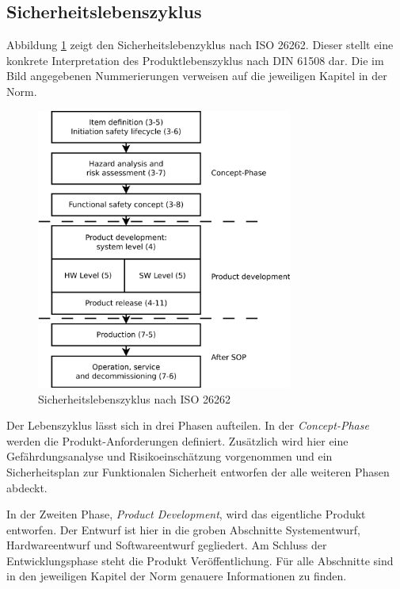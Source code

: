 \documentclass[
  a4paper,					    %
  twoside,
  DIV=calc,     				%
  bibliography=totoc,
  cleardoublepage=empty,
  ngerman,     					%
  final       					%
]{scrbook}
\begin{document}
\subsection{Sicherheitslebenszyklus}
\label{sec:ISO26262_lebenszyklus}

Abbildung \ref{fig:lifecycle} zeigt den Sicherheitslebenzyklus nach ISO 26262. Dieser stellt eine konkrete Interpretation des Produktlebenszyklus nach DIN 61508 dar. Die im Bild angegebenen Nummerierungen verweisen auf die jeweiligen Kapitel in der Norm. 

\begin{figure}[!htbp]
\center
\includegraphics[width=0.75\textwidth]{ISO_26262_Lifecycle}
\caption[Sicherheitslebenszyklus nach ISO 26262]{Sicherheitslebenszyklus nach ISO 26262\cite{iso26262}}
\label{fig:lifecycle}
\end{figure}

Der Lebenszyklus lässt sich in drei Phasen aufteilen. In der \emph{Concept-Phase} werden die Produkt-Anforderungen definiert. Zusätzlich wird hier eine Gefährdungsanalyse und Risikoeinschätzung vorgenommen und ein Sicherheitsplan zur Funktionalen Sicherheit entworfen der alle weiteren Phasen abdeckt.

In der Zweiten Phase, \emph{Product Development}, wird das eigentliche Produkt entworfen. Der Entwurf ist hier in die groben Abschnitte Systementwurf, Hardwareentwurf und Softwareentwurf gegliedert. Am Schluss der Entwicklungsphase steht die Produkt Veröffentlichung. Für alle Abschnitte sind in den jeweiligen Kapitel der Norm genauere Informationen zu finden.
\end{document}
